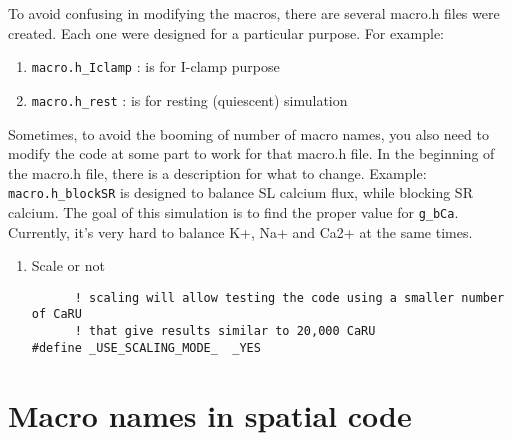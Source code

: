 To avoid confusing in modifying the macros, there are several macro.h files were
created. Each one were designed for a particular purpose. For example: 
\begin{enumerate}
  \item \verb!macro.h_Iclamp! : is for I-clamp purpose
  \item \verb!macro.h_rest! : is for resting (quiescent) simulation
\end{enumerate}
Sometimes, to avoid the booming of number of macro names, you also need to
modify the code at some part to work for that macro.h file. In the beginning of
the macro.h file, there is a description for what to change. Example: 
\verb!macro.h_blockSR! is designed to balance SL calcium flux, while blocking SR
calcium. The goal of this simulation is to find the proper value for
\verb!g_bCa!. Currently, it's very hard to balance K+, Na+ and Ca2+ at the same
times. 

\begin{enumerate}
\item Scale or not
\begin{verbatim}
      ! scaling will allow testing the code using a smaller number of CaRU
      ! that give results similar to 20,000 CaRU
#define _USE_SCALING_MODE_  _YES
\end{verbatim}

 
\end{enumerate}




\section{Macro names in spatial code}


